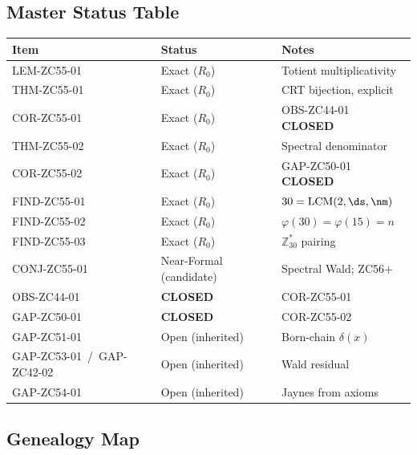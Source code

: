 \documentclass[12pt, a4paper]{article}
\begin{document}
\subsection{Master Status Table}

\begin{center}
\begin{tabular}{@{}lp{4.5cm}p{4cm}@{}}
\toprule
\textbf{Item} & \textbf{Status} & \textbf{Notes} \\
\midrule
LEM-ZC55-01 & Exact ($R_0$) & Totient multiplicativity \\
THM-ZC55-01 & Exact ($R_0$) & CRT bijection, explicit \\
COR-ZC55-01 & Exact ($R_0$) & OBS-ZC44-01 \textbf{CLOSED} \\
THM-ZC55-02 & Exact ($R_0$) & Spectral denominator \\
COR-ZC55-02 & Exact ($R_0$) & GAP-ZC50-01 \textbf{CLOSED} \\
FIND-ZC55-01 & Exact ($R_0$) & $30=\mathrm{LCM}(2,\ds,\nm)$ \\
FIND-ZC55-02 & Exact ($R_0$) & $\varphi(30)=\varphi(15)=n$ \\
FIND-ZC55-03 & Exact ($R_0$) & $\mathbb{Z}_{30}^*$ pairing \\
CONJ-ZC55-01 & Near-Formal (candidate) & Spectral Wald; ZC56+ \\
\midrule
OBS-ZC44-01 & \textbf{CLOSED} & COR-ZC55-01 \\
GAP-ZC50-01 & \textbf{CLOSED} & COR-ZC55-02 \\
GAP-ZC51-01 & Open (inherited) & Born-chain $\delta(x)$ \\
GAP-ZC53-01~/~GAP-ZC42-02 & Open (inherited) & Wald residual \\
GAP-ZC54-01 & Open (inherited) & Jaynes from axioms \\
\bottomrule
\end{tabular}
\end{center}

\subsection{Genealogy Map}
\end{document}
